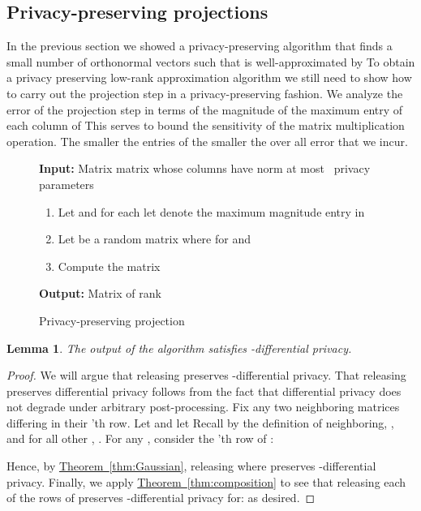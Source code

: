 \documentclass[letterpaper,11pt]{article}
\newtheorem{lemma}[theorem]{Lemma}
\theoremstyle{definition}
\newcommand{\figurelabel}[1]{\label{fig:#1}}
\newcommand{\sectionlabel}[1]{\label{sec:#1}}
\newcommand{\theoremref}[1]{\hyperref[thm:#1]{Theorem~\ref{thm:#1}}}
\begin{document}
\subsection{Privacy-preserving projections}
\sectionlabel{projection}

In the previous section we showed a privacy-preserving algorithm that finds a small number of orthonormal vectors  such that  is well-approximated by
 To obtain a privacy preserving low-rank approximation algorithm we
still need to show how to carry out the projection step in a
privacy-preserving fashion. We analyze the error of the projection
step in terms of the magnitude of the maximum entry of each column of  This serves to bound the sensitivity of the matrix multiplication operation. The smaller the entries of  the smaller the over all error that we incur.

\begin{figure}[h]
\begin{boxedminipage}{\textwidth}
{\bf Input:} Matrix  matrix
 whose columns have norm at most~
privacy parameters 
\begin{enumerate}
\item Let  and for each 
let  denote the maximum magnitude entry in 
\item Let  be a random  matrix where 
for  and 
\item Compute the matrix 
\end{enumerate}
{\bf Output:} Matrix  of rank 
\end{boxedminipage}
\caption{Privacy-preserving projection}
\figurelabel{projection}
\end{figure}

\begin{lemma}
The output  of the algorithm satisfies -differential
privacy.
\end{lemma}

\begin{proof}
We will argue that releasing  preserves
-differential privacy. That releasing  preserves
differential privacy follows from the fact that differential privacy does not
degrade under arbitrary post-processing.  Fix any two neighboring matrices  differing in their 'th row. Let  and
let 
Recall by the definition of neighboring, , and for all
other , . For any , consider the 'th
row of :

Hence, by \theoremref{Gaussian}, releasing  where  preserves -differential privacy.  Finally, we apply
\theoremref{composition} to see that releasing each of the  rows of 
preserves -differential privacy for: 
as desired.
\end{proof}
\end{document}
